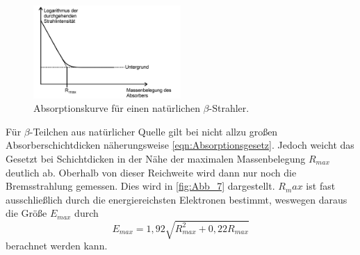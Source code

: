 \begin{figure}[H]
    \centering
    \includegraphics[width=0.5\textwidth]{build/Abb_7.png}
    \caption {Absorptionskurve für einen natürlichen $\beta$-Strahler\cite[241]{V704}.}
    \label{fig:Abb_7}
\end{figure}
Für $\beta$-Teilchen aus natürlicher Quelle gilt bei nicht allzu großen Absorberschichtdicken näherungsweise \autoref{eqn:Absorptionsgesetz}.
Jedoch weicht das Gesetzt bei Schichtdicken in der Nähe der maximalen Massenbelegung $R_{max}$ deutlich ab.
Oberhalb von dieser Reichweite wird dann nur noch die Bremsstrahlung gemessen. Dies wird in \autoref{fig:Abb_7} dargestellt.
$R_max$ ist fast ausschließlich durch die energiereichsten Elektronen bestimmt, weswegen daraus die Größe $E_{max}$ durch
\begin{equation}
    E_{max} = 1,92 \sqrt{R_{max}^2 + 0,22 R_{max}}
    \label{eqn:Emax}
\end{equation}
berachnet werden kann.

